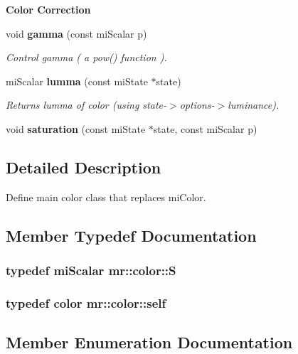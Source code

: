 \begin{Indent}{\bf Color Correction}\par
\begin{CompactItemize}
\item 
void {\bf gamma} (const mi\-Scalar p)
\begin{CompactList}\small\item\em Control gamma ( a pow() function ). \item\end{CompactList}\item 
mi\-Scalar {\bf lumma} (const mi\-State $\ast$state)
\begin{CompactList}\small\item\em Returns lumma of color (using state-$>$options-$>$luminance). \item\end{CompactList}\item 
void {\bf saturation} (const mi\-State $\ast$state, const mi\-Scalar p)
\end{CompactItemize}
\end{Indent}


\subsection{Detailed Description}
Define main color class that replaces mi\-Color. 



\subsection{Member Typedef Documentation}
\subsubsection{\setlength{\rightskip}{0pt plus 5cm}typedef mi\-Scalar {\bf mr::color::S}}\label{structmr_1_1color_w1}


\subsubsection{\setlength{\rightskip}{0pt plus 5cm}typedef {\bf color} {\bf mr::color::self}}\label{structmr_1_1color_w0}




\subsection{Member Enumeration Documentation}
